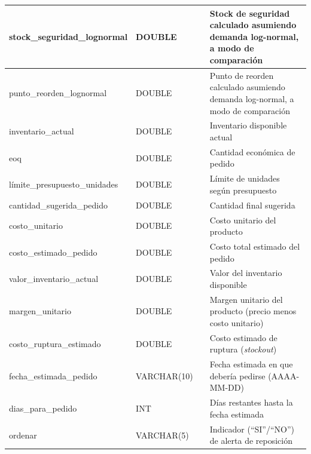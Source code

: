 \begin{table}[H]
\begin{tabularx}{\textwidth}{|>{\raggedright\arraybackslash}p{3.0cm}|l|>{\raggedright\arraybackslash}p{3.2cm}|X|}
\hline
stock\_\discretionary{}{}{}seguridad\_\discretionary{}{}{}lognormal & DOUBLE & & Stock de seguridad calculado asumiendo demanda log-normal, a modo de comparación \\
\hline
punto\_\discretionary{}{}{}reorden\_\discretionary{}{}{}lognormal & DOUBLE & & Punto de reorden calculado asumiendo demanda log-normal, a modo de comparación \\
\hline
inventario\_\discretionary{}{}{}actual & DOUBLE & & Inventario disponible actual \\
\hline
eoq & DOUBLE & & Cantidad económica de pedido \\
\hline
límite\_\discretionary{}{}{}presupuesto\_\discretionary{}{}{}unidades & DOUBLE & & Límite de unidades según presupuesto \\
\hline
cantidad\_\discretionary{}{}{}sugerida\_\discretionary{}{}{}pedido & DOUBLE & & Cantidad final sugerida \\
\hline
costo\_\discretionary{}{}{}unitario & DOUBLE & & Costo unitario del producto \\
\hline
costo\_\discretionary{}{}{}estimado\_\discretionary{}{}{}pedido & DOUBLE & & Costo total estimado del pedido \\
\hline
valor\_\discretionary{}{}{}inventario\_\discretionary{}{}{}actual & DOUBLE & & Valor del inventario disponible \\
\hline
margen\_\discretionary{}{}{}unitario & DOUBLE & & Margen unitario del producto (precio menos costo unitario) \\
\hline
costo\_\discretionary{}{}{}ruptura\_\discretionary{}{}{}estimado & DOUBLE & & Costo estimado de ruptura (\textit{stockout}) \\
\hline
fecha\_\discretionary{}{}{}estimada\_\discretionary{}{}{}pedido & VARCHAR(10) & & Fecha estimada en que debería pedirse (AAAA-MM-DD) \\
\hline
dias\_\discretionary{}{}{}para\_\discretionary{}{}{}pedido & INT & & Días restantes hasta la fecha estimada \\
\hline
ordenar & VARCHAR(5) & & Indicador (``SI''/``NO'') de alerta de reposición \\
\hline
\end{tabularx}
\end{table}

